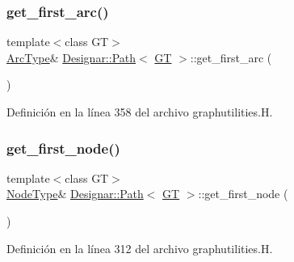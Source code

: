 \subsubsection{\texorpdfstring{get\+\_\+first\+\_\+arc()}{get\_first\_arc()}}
{\footnotesize\ttfamily template$<$class GT$>$ \\
\hyperlink{class_designar_1_1_path_a6e13966351659cedcf3233098b2b7384}{Arc\+Type}\& \hyperlink{class_designar_1_1_path}{Designar\+::\+Path}$<$ \hyperlink{demo-buildgraph_8_c_a3001c40d2c31ca87ed96cd7d1334a55e}{GT} $>$\+::get\+\_\+first\+\_\+arc (\begin{DoxyParamCaption}{ }\end{DoxyParamCaption})\hspace{0.3cm}{\ttfamily [inline]}}



Definición en la línea 358 del archivo graphutilities.\+H.

\mbox{\label{class_designar_1_1_path_a7d45c6df09b310fc0c0a65bd3c8db109}} 
\subsubsection{\texorpdfstring{get\+\_\+first\+\_\+node()}{get\_first\_node()}\hspace{0.1cm}{\footnotesize\ttfamily [1/2]}}
{\footnotesize\ttfamily template$<$class GT$>$ \\
\hyperlink{class_designar_1_1_path_a7b499fd50e96e3360968d4cfef7a3736}{Node\+Type}\& \hyperlink{class_designar_1_1_path}{Designar\+::\+Path}$<$ \hyperlink{demo-buildgraph_8_c_a3001c40d2c31ca87ed96cd7d1334a55e}{GT} $>$\+::get\+\_\+first\+\_\+node (\begin{DoxyParamCaption}{ }\end{DoxyParamCaption})\hspace{0.3cm}{\ttfamily [inline]}}



Definición en la línea 312 del archivo graphutilities.\+H.

\mbox{\label{class_designar_1_1_path_a6750bfef2944f6c938bee68da8c904c6}} 
